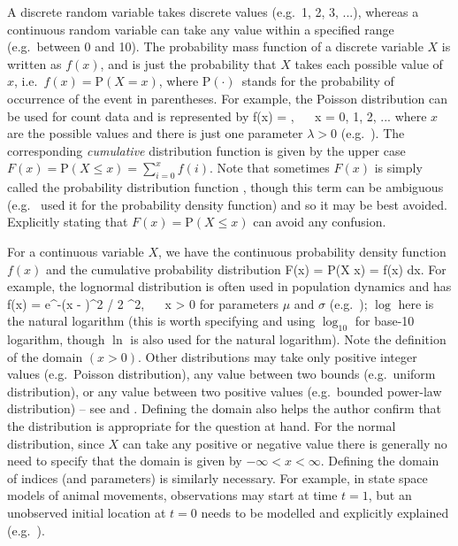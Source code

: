 A discrete random variable takes discrete values (e.g.~1, 2, 3, ...), whereas
a continuous random variable can take any value within a specified range
(e.g.~between 0 and 10). The probability mass function of a discrete variable
$X$
is written as $f(x)$, and is just the probability that $X$ takes each possible
value of $x$, i.e.~$f(x) = \mbox{P}(X = x)$, where
P$(\cdot)$~stands for the probability of occurrence of the event in parentheses.
For example, the Poisson distribution can be used for count
data and is represented by
\eb
f(x) = ,
  ~~ x = 0, 1, 2, ...
\label{poisson}
\ee
where $x$ are the possible values and there is just one parameter $\lambda>0$
(e.g.~\citealt{bolk08}). The corresponding \emph{cumulative} distribution
function is given by the upper case
$F(x) = \mbox{P}(X \leq x) = \sum_{i=0}^{x} f(i)$.
Note that sometimes $F(x)$ is simply called the probability distribution
function \citep{gs90}, though this term can be ambiguous (e.g.~\citealt{cw11}
used it for the probability density function) and so it may be best
avoided.
Explicitly stating that
$F(x) = \mbox{P}(X \leq x)$ can avoid any confusion.

For a continuous variable $X$, we have the continuous probability density
function $f(x)$ and the cumulative probability distribution
\eb
F(x) = \mbox{P}(X \leq x) = \int f(x) \mbox{d}x.
\ee
For example, the lognormal distribution is often used in population dynamics
and has
\eb
f(x) =  \mbox{e}^{-(\log x - \mu)^2 / 2
  \sigma^2}, ~~ x > 0
\label{lognormal}
\ee
for parameters $\mu$ and $\sigma$ (e.g.~\citealt{bolk08}); $\log$ here is
the natural logarithm (this is worth specifying and using $\log_{10}$ for
base-10 logarithm, though $\ln$ is also used for the natural logarithm).
Note the definition
of the domain $(x > 0)$.
Other distributions may take only positive integer values
(e.g.~Poisson distribution),
any value between two bounds (e.g.~uniform distribution), or any value
between two positive values (e.g.~bounded power-law distribution) --
see \citet{bolk08} and \citet{erpbb17}. Defining the domain also helps the
author confirm that the distribution is appropriate for the
question at hand. For the normal distribution, since $X$
can take any positive or negative value there is generally no need to
specify that the domain is given by $-\infty < x < \infty$.
Defining the domain of indices (and parameters) is similarly necessary. For
example, in state space models of animal movements, observations may start
at time $t=1$, but an unobserved initial location at $t=0$ needs to be modelled
and explicitly explained (e.g.~\citealt{augerm16}).

